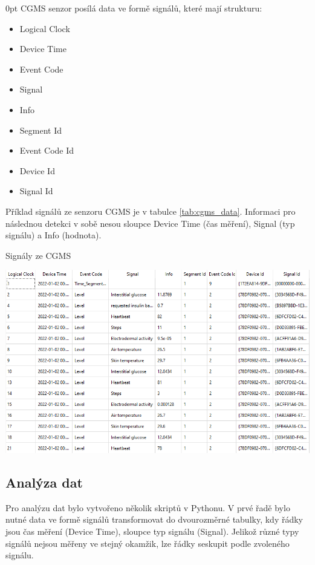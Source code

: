 \begin{setlength}{\parskip}{0pt}
CGMS senzor posílá data ve formě signálů, které mají strukturu:
\begin{itemize}
\setlength\itemsep{0em}
\item Logical Clock
\item Device Time
\item Event Code
\item Signal
\item Info
\item Segment Id
\item Event Code Id
\item Device Id
\item Signal Id
\end{itemize}
\end{setlength}

Příklad signálů ze senzoru CGMS je v tabulce \ref{tab:cgms_data}. Informaci pro následnou detekci v sobě nesou sloupce Device Time (čas měření), Signal (typ signálu) a Info (hodnota).

\begin{table}[H]
\caption{Signály ze CGMS}
\label{tab:cgms_data}
\centering
\includegraphics[width=1\textwidth]{img/cho/cgms_data.png}
\end{table}

\subsection{Analýza dat}

Pro analýzu dat bylo vytvořeno několik skriptů v Pythonu. V prvé řadě bylo nutné data ve formě signálů transformovat do dvourozměrné tabulky, kdy řádky jsou čas měření (Device Time), sloupce typ signálu (Signal). Jelikož různé typy signálů nejsou měřeny ve stejný okamžik, lze řádky seskupit podle zvoleného signálu.

